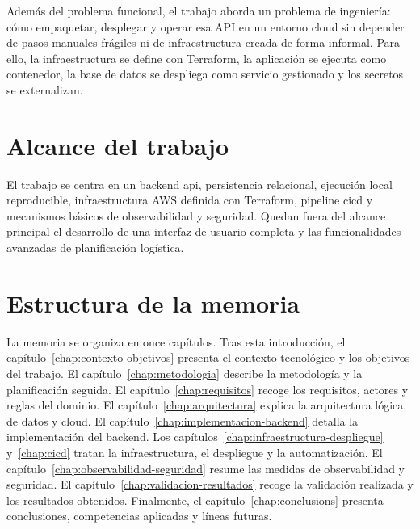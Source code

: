 Además del problema funcional, el trabajo aborda un problema de ingeniería: cómo empaquetar, desplegar y operar esa API en un entorno cloud sin depender de pasos manuales frágiles ni de infraestructura creada de forma informal. Para ello, la infraestructura se define con Terraform, la aplicación se ejecuta como contenedor, la base de datos se despliega como servicio gestionado y los secretos se externalizan.

\section{Alcance del trabajo}
\label{sec:alcance}

El trabajo se centra en un \gls{backend} \acrshort{api}, persistencia relacional, ejecución local reproducible, infraestructura AWS definida con Terraform, pipeline \acrshort{cicd} y mecanismos básicos de observabilidad y seguridad. Quedan fuera del alcance principal el desarrollo de una interfaz de usuario completa y las funcionalidades avanzadas de planificación logística.

\section{Estructura de la memoria}
\label{sec:estructura-memoria}

La memoria se organiza en once capítulos. Tras esta introducción, el capítulo~\ref{chap:contexto-objetivos} presenta el contexto tecnológico y los objetivos del trabajo. El capítulo~\ref{chap:metodologia} describe la metodología y la planificación seguida. El capítulo~\ref{chap:requisitos} recoge los requisitos, actores y reglas del dominio. El capítulo~\ref{chap:arquitectura} explica la arquitectura lógica, de datos y cloud. El capítulo~\ref{chap:implementacion-backend} detalla la implementación del backend. Los capítulos~\ref{chap:infraestructura-despliegue} y~\ref{chap:cicd} tratan la infraestructura, el despliegue y la automatización. El capítulo~\ref{chap:observabilidad-seguridad} resume las medidas de observabilidad y seguridad. El capítulo~\ref{chap:validacion-resultados} recoge la validación realizada y los resultados obtenidos. Finalmente, el capítulo~\ref{chap:conclusions} presenta conclusiones, competencias aplicadas y líneas futuras.

